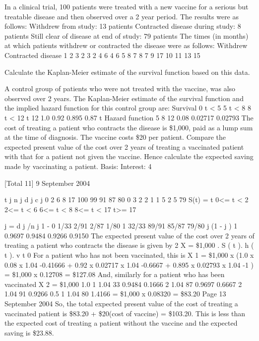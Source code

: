 \documentclass[a4paper,12pt]{article}
\begin{document}
In a clinical trial, 100 patients were treated with a new vaccine for a serious but
treatable disease and then observed over a 2 year period. The results were as follows:
Withdrew from study: 13 patients
Contracted disease during study: 8 patients
Still clear of disease at end of study: 79 patients
The times (in months) at which patients withdrew or contracted the disease were as
follows:
Withdrew
Contracted disease
1
2
3
2
3
2
4
6
4
6
5
8
7
8
7 9
17
10 11 13 15
\item  Calculate the Kaplan-Meier estimate of the survival function based on this
data.

\item  A control group of patients who were not treated with the vaccine, was also
observed over 2 years. The Kaplan-Meier estimate of the survival function
and the implied hazard function for this control group are:
Survival
0 t < 5
5 t < 8
8 t < 12
t 12
1.0
0.92
0.895
0.87
t Hazard function
5
8
12 0.08
0.02717
0.02793
The cost of treating a patient who contracts the disease is \$1,000, paid as a
lump sum at the time of diagnosis. The vaccine costs \$20 per patient.
Compare the expected present value of the cost over 2 years of treating a
vaccinated patient with that for a patient not given the vaccine. Hence
calculate the expected saving made by vaccinating a patient.
Basis: Interest: 4%

[Total 11]
9
September 2004
\item 
t j n j d j c j
0
2
6
8
17 100
99
91
87
80 0
3
2
2
1 1
5
2
5
79
S(t) =
t
0<= t < 2
2<= t < 6
6<= t < 8
8<= t < 17
t>= 17
\item 
j
= d j /n j 1 -
0
1/33
2/91
2/87
1/80 1
32/33
89/91
85/87
79/80
j
(1 - j )
1
0.9697
0.9484
0.9266
0.9150
The expected present value of the cost over 2 years of treating a patient who
contracts the disease is given by
2
X = \$1,000 .
S ( t ). h ( t ). v t
0
For a patient who has not been vaccinated, this is
X 1 = \$1,000 x (1.0 x 0.08 x 1.04 -0.41666 + 0.92 x 0.02717 x 1.04 -0.6667
+ 0.895 x 0.02793 x 1.04 -1 )
= \$1,000 x 0.12708
= \$127.08
And, similarly for a patient who has been vaccinated
X 2 = \$1,000 1.0
1
1.04
33
0.9484
0.1666
2
1.04
87
0.9697
0.6667
2
1.04
91
0.9266
0.5
1
1.04
80
1.4166
= \$1,000 x 0.08320
= \$83.20
Page 13 %
September 2004
So, the total expected present value of the cost of treating a vaccinated patient
is \$83.20 + \$20(cost of vaccine) = \$103.20.
This is less than the expected cost of treating a patient without the vaccine and
the expected saving is \$23.88.
\end{document}
